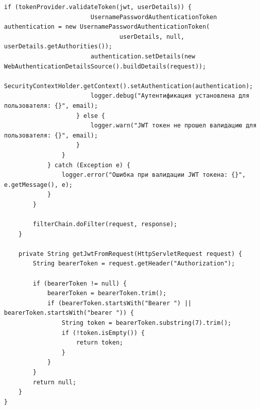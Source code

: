 \begin{lstlisting}[basicstyle=\tiny\ttfamily,breaklines=true]
                    if (tokenProvider.validateToken(jwt, userDetails)) {
                        UsernamePasswordAuthenticationToken authentication = new UsernamePasswordAuthenticationToken(
                                userDetails, null, userDetails.getAuthorities());
                        authentication.setDetails(new WebAuthenticationDetailsSource().buildDetails(request));
                        SecurityContextHolder.getContext().setAuthentication(authentication);
                        logger.debug("Аутентификация установлена для пользователя: {}", email);
                    } else {
                        logger.warn("JWT токен не прошел валидацию для пользователя: {}", email);
                    }
                }
            } catch (Exception e) {
                logger.error("Ошибка при валидации JWT токена: {}", e.getMessage(), e);
            }
        }

        filterChain.doFilter(request, response);
    }

    private String getJwtFromRequest(HttpServletRequest request) {
        String bearerToken = request.getHeader("Authorization");
        
        if (bearerToken != null) {
            bearerToken = bearerToken.trim();
            if (bearerToken.startsWith("Bearer ") || bearerToken.startsWith("bearer ")) {
                String token = bearerToken.substring(7).trim();
                if (!token.isEmpty()) {
                    return token;
                }
            }
        }
        return null;
    }
}
\end{lstlisting}

